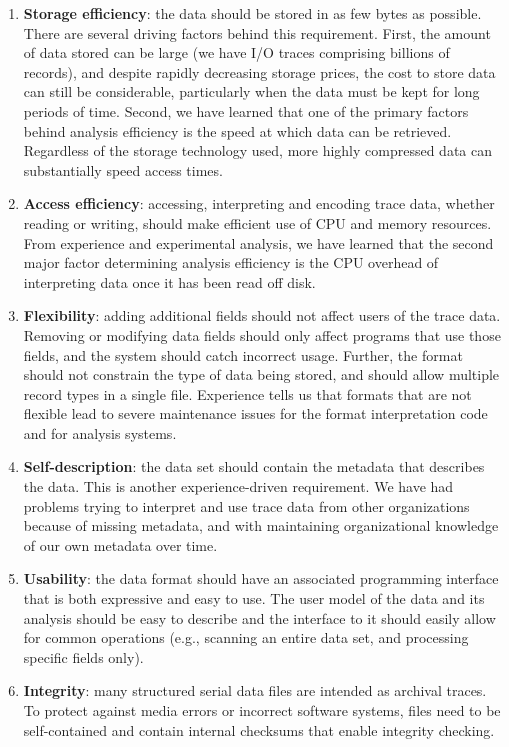 \documentclass{acm_proc_article-sp}
\begin{document}
\begin{enumerate}

\item \textbf{Storage efficiency}: the data should be stored in as few
bytes as possible. There are several driving factors behind this
requirement. 
First, the amount of data stored can be large (we have
I/O traces comprising billions of records), and despite rapidly
decreasing storage prices, the cost to store data can still be
considerable, particularly when the data must be kept for long periods
of time. 
Second, we have learned that one of the primary factors
behind analysis efficiency is the speed at which data can be
retrieved. Regardless of the storage technology used, more highly
compressed data can substantially speed access times.

\item \textbf{Access efficiency}: accessing, interpreting and encoding
trace data, whether reading or writing, should make efficient use of
CPU and memory resources. From experience and experimental analysis,
we have learned that the second major factor determining analysis
efficiency is the CPU overhead of interpreting data once it has been
read off disk.

\item \textbf{Flexibility}: adding additional fields should not affect
users of the trace data.  Removing or modifying data fields should
only affect programs that use those fields, and the system should
catch incorrect usage.  Further, the format should not constrain
the type of data being stored, and should allow multiple record types
in a single file. 
Experience 
tells us that formats that
are not flexible lead to severe maintenance issues for 
the format
interpretation code and for analysis systems.

\item \textbf{Self-description}: the data set should contain the
metadata that describes the data. This is another experience-driven
requirement. We have had problems trying to interpret and use trace
data from other organizations because of missing metadata, and with
maintaining organizational knowledge of our own metadata over time.

\item \textbf{Usability}: the data format should have an
associated programming interface that is both expressive and easy to
use. 
The user model of the data and its analysis should
be easy to describe and the interface to it should easily allow for
common operations (e.g., scanning an entire data set, and processing
specific fields only).

\item \textbf{Integrity}: many structured serial data files are 
intended as archival traces. To protect against media
errors or incorrect software systems, 
files need to be
self-contained and contain internal checksums that enable
integrity checking.

\end{enumerate}
\end{document}

